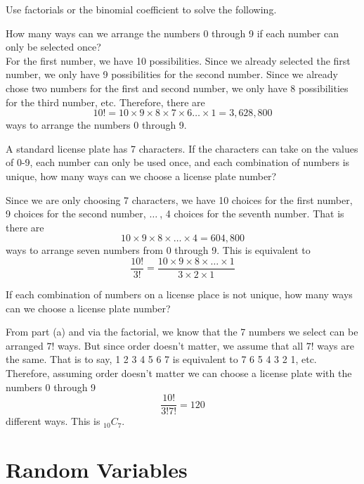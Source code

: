 \begin{example}
Use factorials or the binomial coefficient to solve the following.
\begin{benumerate}
\item How many ways can we arrange the numbers 0 through 9 if each number can only be selected once? \\
For the first number, we have 10 possibilities. Since we already selected the first number, we only have 9 possibilities for the second number. Since we already chose two numbers for the first and second number, we only have 8 possibilities for the third number, etc. Therefore, there are
\[10! =  10 \times 9 \times 8 \times 7 \times 6 \hdots \times 1 = 3,628,800\]
ways to arrange the numbers 0 through 9.


\item A standard license plate has 7 characters. If the characters can take on the values of 0-9, each number can only be used once, and each combination of numbers is unique, how many ways can we choose a license plate number? 

Since we are only choosing 7 characters, we have 10 choices for the first number, 9 choices for the second number, $\hdots~$, 4 choices for the seventh number. That is there are 
\[ 10 \times 9 \times 8 \times \hdots \times 4 = 604, 800 \]
ways to arrange seven numbers from 0 through 9. This is equivalent to 
\[ \frac{10!}{3!} = \frac{10 \times 9 \times 8 \times \hdots \times 1}{3 \times 2 \times 1} \]

\item If each combination of numbers on a license place is not unique, how many ways can we choose a license plate number? 

From part (a) and via the factorial, we know that the 7 numbers we select can be arranged $7!$ ways. But since order doesn't matter, we assume that all $7!$ ways are the same. That is to say, 1 2 3 4 5 6 7 is equivalent to 7 6 5 4 3 2 1, etc. Therefore, assuming order doesn't matter we can choose a license plate with the numbers 0 through 9
\[ \frac{10!}{3!7!} = 120 \]
different ways. This is $_{10}C_{7}$.

\end{benumerate}
\end{example}

\section{Random Variables}

